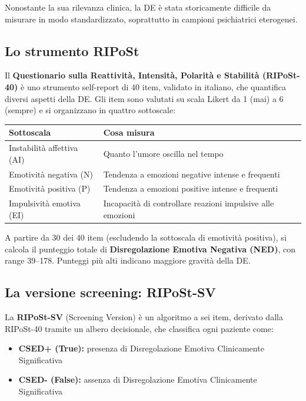 \documentclass[12pt, a4paper]{article}
\begin{document}
Nonostante la sua rilevanza clinica, la DE è stata storicamente difficile da misurare in
modo standardizzato, soprattutto in campioni psichiatrici eterogenei.

\subsection{Lo strumento RIPoSt}

Il \textbf{Questionario sulla Reattività, Intensità, Polarità e Stabilità (RIPoSt-40)} è uno
strumento self-report di 40 item, validato in italiano, che quantifica diversi aspetti della
DE. Gli item sono valutati su scala Likert da 1 (mai) a 6 (sempre) e si organizzano in
quattro sottoscale:

\begin{center}
\begin{tabular}{lp{9cm}}
\toprule
\textbf{Sottoscala} & \textbf{Cosa misura} \\
\midrule
Instabilità affettiva (AI) & Quanto l'umore oscilla nel tempo \\
Emotività negativa (N) & Tendenza a emozioni negative intense e frequenti \\
Emotività positiva (P) & Tendenza a emozioni positive intense e frequenti \\
Impulsività emotiva (EI) & Incapacità di controllare reazioni impulsive alle emozioni \\
\bottomrule
\end{tabular}
\end{center}

A partire da 30 dei 40 item (escludendo la sottoscala di emotività positiva), si calcola il
punteggio totale di \textbf{Disregolazione Emotiva Negativa (NED)}, con range 39--178.
Punteggi più alti indicano maggiore gravità della DE.

\subsection{La versione screening: RIPoSt-SV}

La \textbf{RIPoSt-SV} (Screening Version) è un algoritmo a sei item, derivato dalla RIPoSt-40
tramite un albero decisionale, che classifica ogni paziente come:

\begin{itemize}
    \item \textbf{CSED+ (True):} presenza di Disregolazione Emotiva Clinicamente Significativa
    \item \textbf{CSED- (False):} assenza di Disregolazione Emotiva Clinicamente Significativa
\end{itemize}
\end{document}
